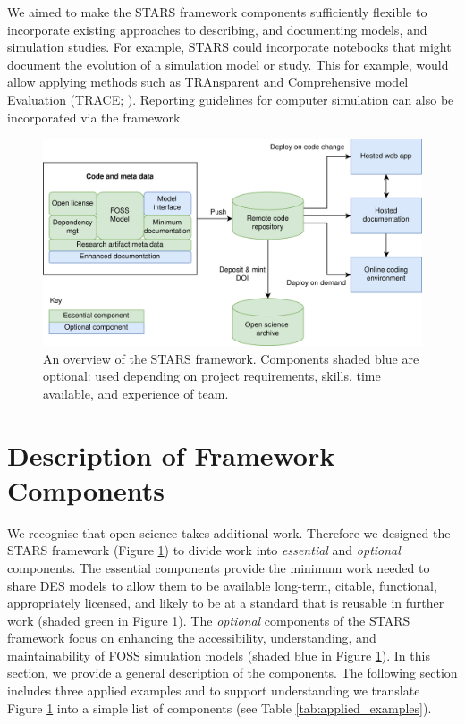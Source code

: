 \documentclass[]{interact}
\theoremstyle{plain}%
\theoremstyle{definition}
\theoremstyle{remark}
\begin{document}
We aimed to make the STARS framework components sufficiently flexible to incorporate existing approaches to describing, and documenting models, and simulation studies. For example, STARS could incorporate notebooks that might document the evolution of a simulation model or study. This for example, would allow applying methods such as TRAnsparent and Comprehensive model Evaluation (TRACE; \cite{TRACE_2021}). Reporting guidelines for computer simulation \citep{monks2019strengthening, ZHANG2020506} can also be incorporated via the framework.


\begin{figure}
    \centering
    \includegraphics[scale=0.85]{images/stars_framework_overview.png}
    \caption{An overview of the STARS framework. Components shaded blue are optional: used depending on project requirements, skills, time available, and experience of team.}
    \label{fig:overview}
\end{figure}

\section{Description of Framework Components}

We recognise that open science takes additional work. Therefore we designed the STARS framework (Figure \ref{fig:overview}) to divide work into \textit{essential} and \textit{optional} components. The essential components provide the minimum work needed to share DES models to allow them to be available long-term, citable, functional, appropriately licensed, and likely to be at a standard that is reusable in further work  (shaded green in Figure \ref{fig:overview}).  The \textit{optional} components of the STARS framework focus on enhancing the accessibility, understanding, and maintainability of FOSS simulation models  (shaded blue in Figure \ref{fig:overview}).  In this section, we provide a general description of the components.  The following section includes three applied examples and to support understanding we translate Figure \ref{fig:overview} into a simple list of components (see Table \ref{tab:applied_examples}).
\end{document}
